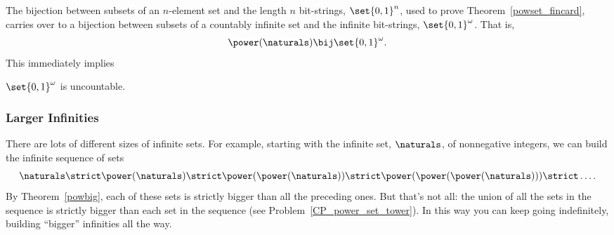 The bijection between subsets of an $n$-element set and the length $n$
bit-strings, $\set{0,1}^n$, used to prove
Theorem~\ref{powset_fincard}, carries over to a bijection between
subsets of a countably infinite set and the infinite bit-strings,
$\set{0,1}^{\omega}$.  That is,
\[
\power(\naturals) \bij \set{0,1}^{\omega}.
\]
This immediately implies
\begin{corollary}
$\set{0,1}^{\omega}$ is uncountable.
\end{corollary}

\subsubsection{Larger Infinities}

There are lots of different sizes of infinite sets.  For example,
starting with the infinite set, $\naturals$, of nonnegative integers,
we can build the infinite sequence of sets
\[
\naturals \strict \power(\naturals) \strict \power(\power(\naturals))
\strict \power(\power(\power(\naturals))) \strict \dots.
\]
By Theorem~\ref{powbig}, each of these sets is strictly bigger than
all the preceding ones.  But that's not all: the union of all the sets
in the sequence is strictly bigger than each set in the sequence (see
Problem~\ref{CP_power_set_tower}).  In this way you can keep going
indefinitely, building ``bigger'' infinities all the way.

